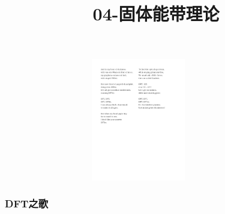 {\frame
{
	\frametitle{}
\begin{figure}[h!]
	\vspace{-10pt}
\centering
\includegraphics[height=2.10in,width=3.8in,viewport=0 350 550 650,clip]{Figures/DFT_song-2.pdf}
\label{DFT_Song_03}
\end{figure}
}

\frame
{
	\frametitle{{\rm DFT}之歌}
\begin{figure}[h!]
	\vspace{-10pt}
\centering
{}     %
\label{DFT_Song_04}
\end{figure}
}

\title{04-固体能带理论}
}
